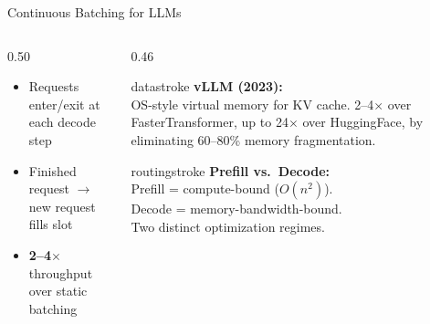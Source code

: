 \documentclass[aspectratio=169, 12pt]{beamer}
\begin{document}
\begin{frame}{Continuous Batching for LLMs}
\begin{columns}[T]
\begin{column}{0.50\textwidth}
    \vspace{0.1cm}
    {\footnotesize
    \begin{itemize}\setlength\itemsep{0pt}
      \item Requests enter/exit at each decode step
      \item Finished request $\to$ new request fills slot
      \item \textbf{2--4$\times$} throughput over static batching
    \end{itemize}
    }
  \end{column}
  \begin{column}{0.46\textwidth}
    \begin{mlsyscard}{datastroke}
    \textbf{vLLM (2023):}\\
    {\footnotesize OS-style virtual memory for KV cache.
    2--4$\times$ over FasterTransformer,
    up to 24$\times$ over HuggingFace,
    by eliminating 60--80\% memory fragmentation.}
    \end{mlsyscard}

    \vspace{0.15cm}
    \begin{mlsyscard}{routingstroke}
    \textbf{Prefill vs.\ Decode:}\\
    {\footnotesize Prefill = compute-bound ($O(n^2)$).\\
    Decode = memory-bandwidth-bound.\\
    Two distinct optimization regimes.}
    \end{mlsyscard}
  \end{column}
\end{columns}

\end{frame}
\end{document}
